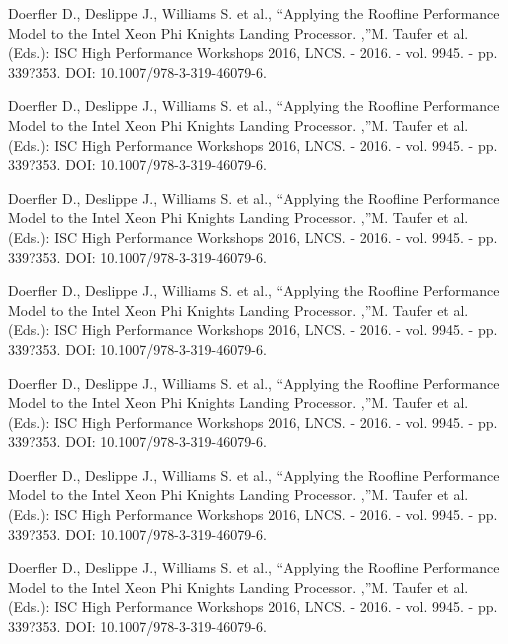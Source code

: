 \documentclass[
11pt,%
tightenlines,%
twoside,%
onecolumn,%
nofloats,%
nobibnotes,%
nofootinbib,%
superscriptaddress,%
noshowpacs,%
centertags]%
{revtex4}
\begin{document}
\begin{thebibliography}{99}

Doerfler D., Deslippe J., Williams S. et al., \textquotedblleft Applying the Roofline Performance Model to the Intel Xeon Phi Knights Landing Processor. ,\textquotedblright M. Taufer et al. (Eds.): ISC High Performance Workshops 2016, LNCS. - 2016. - vol. 9945. - pp. 339?353. DOI: 10.1007/978-3-319-46079-6.

Doerfler D., Deslippe J., Williams S. et al., \textquotedblleft Applying the Roofline Performance Model to the Intel Xeon Phi Knights Landing Processor. ,\textquotedblright M. Taufer et al. (Eds.): ISC High Performance Workshops 2016, LNCS. - 2016. - vol. 9945. - pp. 339?353. DOI: 10.1007/978-3-319-46079-6.

Doerfler D., Deslippe J., Williams S. et al., \textquotedblleft Applying the Roofline Performance Model to the Intel Xeon Phi Knights Landing Processor. ,\textquotedblright M. Taufer et al. (Eds.): ISC High Performance Workshops 2016, LNCS. - 2016. - vol. 9945. - pp. 339?353. DOI: 10.1007/978-3-319-46079-6.

Doerfler D., Deslippe J., Williams S. et al., \textquotedblleft Applying the Roofline Performance Model to the Intel Xeon Phi Knights Landing Processor. ,\textquotedblright M. Taufer et al. (Eds.): ISC High Performance Workshops 2016, LNCS. - 2016. - vol. 9945. - pp. 339?353. DOI: 10.1007/978-3-319-46079-6.

Doerfler D., Deslippe J., Williams S. et al., \textquotedblleft Applying the Roofline Performance Model to the Intel Xeon Phi Knights Landing Processor. ,\textquotedblright M. Taufer et al. (Eds.): ISC High Performance Workshops 2016, LNCS. - 2016. - vol. 9945. - pp. 339?353. DOI: 10.1007/978-3-319-46079-6.

Doerfler D., Deslippe J., Williams S. et al., \textquotedblleft Applying the Roofline Performance Model to the Intel Xeon Phi Knights Landing Processor. ,\textquotedblright M. Taufer et al. (Eds.): ISC High Performance Workshops 2016, LNCS. - 2016. - vol. 9945. - pp. 339?353. DOI: 10.1007/978-3-319-46079-6.

Doerfler D., Deslippe J., Williams S. et al., \textquotedblleft Applying the Roofline Performance Model to the Intel Xeon Phi Knights Landing Processor. ,\textquotedblright M. Taufer et al. (Eds.): ISC High Performance Workshops 2016, LNCS. - 2016. - vol. 9945. - pp. 339?353. DOI: 10.1007/978-3-319-46079-6.


\end{thebibliography}
\end{document}
